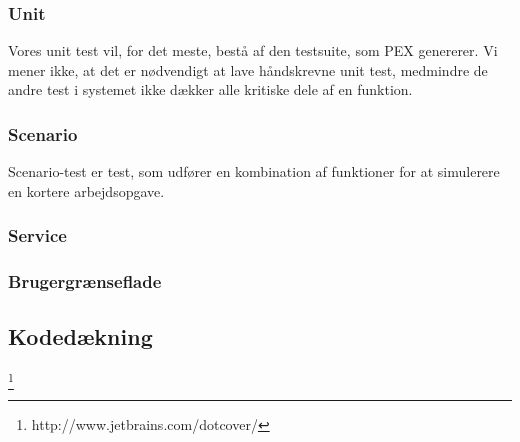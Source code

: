 \subsubsection{Unit}
\label{Test_intendedStrat_types_unit}
Vores unit test vil, for det meste, bestå af den testsuite, som PEX genererer. Vi mener ikke, at det er nødvendigt at lave håndskrevne unit test, medmindre de andre test i systemet ikke dækker alle kritiske dele af en funktion.

\subsubsection{Scenario}
\label{Test_intendedStrat_types_sce}
Scenario-test er test, som udfører en kombination af funktioner for at simulerere en kortere arbejdsopgave. 
\subsubsection{Service}
\label{Test_intendedStrat_types_service}

\subsubsection{Brugergrænseflade}
\label{Test_intendedStrat_types_UI}

\subsection{Kodedækning}
\label{Test_intendedStrat_coverage}
\footnote{http://www.jetbrains.com/dotcover/}